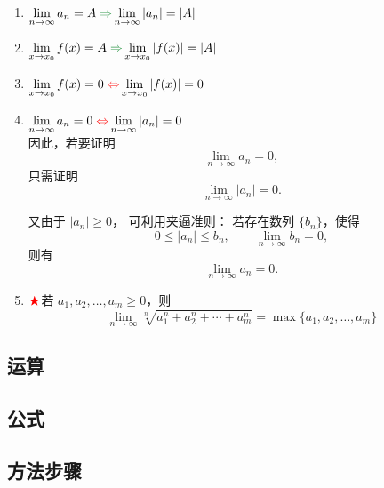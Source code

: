 \documentclass[a4paper,12pt]{article}
\begin{document}
    \begin{enumerate}
        \item $\lim\limits_{n\to\infty} a_n = A \; {\color[rgb]{0.2, 0.6, 0.3}{\Rightarrow}} \lim\limits_{n\to\infty} |a_n| = |A|$
        \item $\lim\limits_{x\to x_0} f(x) = A \; {\color[rgb]{0.2, 0.6, 0.3}{\Rightarrow}} \lim\limits_{x\to x_0} |f(x)| = |A|$
        \item $\lim\limits_{x\to x_0} f(x) = 0 \; {\color{red}{\Leftrightarrow}} \lim\limits_{x\to x_0} |f(x)| = 0$
        \item $\lim\limits_{n\to\infty} a_n = 0 \; {\color{red}{\Leftrightarrow}} \lim\limits_{n\to\infty} |a_n| = 0$ \\
        因此，若要证明
        \[
            \lim_{n\to\infty} a_n = 0,
        \]
        只需证明
        \[
            \lim_{n\to\infty} |a_n| = 0.
        \]

        又由于 $|a_n|\ge 0$，
        可利用夹逼准则：
        若存在数列 $\{b_n\}$，使得
        \[
            0 \le |a_n| \le b_n,
            \qquad
            \lim_{n\to\infty} b_n = 0,
        \]
        则有
        \[
            \lim_{n\to\infty} a_n = 0.
        \]
        \item $\color{red}{\bigstar}$若 $a_1,a_2,\dots,a_m \ge 0$，则
        \[
            \lim_{n\to\infty} \sqrt[n]{a_1^n + a_2^n + \cdots + a_m^n}
            = \max\{a_1,a_2,\dots,a_m\}
        \]
    \end{enumerate}

    \subsection{运算}

    \begin{enumerate}

    \end{enumerate}

    \subsection{公式}

    \begin{enumerate}

    \end{enumerate}

    \subsection{方法步骤}
\end{document}
